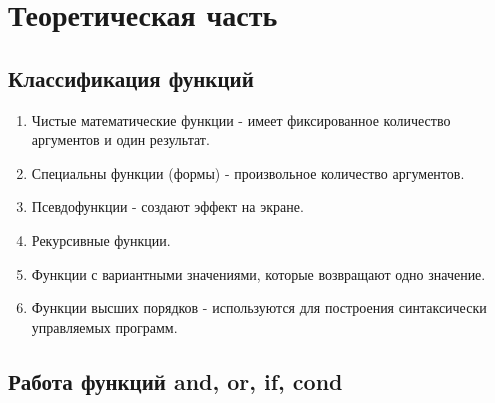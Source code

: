 \documentclass[a4paper,oneside,12pt]{extreport}
\begin{document}
\newpage

\section*{Теоретическая часть}

\subsection*{Классификация функций}

\begin{enumerate}
	\item Чистые математические функции - имеет фиксированное количество аргументов и один результат.
	\item Специальны функции (формы) - произвольное количество аргументов.
	\item Псевдофункции - создают эффект на экране.
	\item Рекурсивные функции.
	\item Функции с вариантными значениями, которые возвращают одно значение.
	\item Функции высших порядков - используются для построения синтаксически управляемых программ. %
\end{enumerate}

\subsection*{Работа функций and, or, if, cond}
\end{document}
